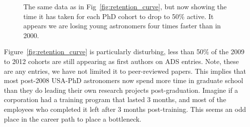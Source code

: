 \documentclass[preprint2]{aastex}
\begin{document}
\begin{figure*}
  \caption{The fraction of Astronomy PhDs still active as first authors on any type of ADS entry (e.g., peer-reviewed journal articles, conference proceedings, grant proposals, arXive papers, etc).  Error bars show ranges computed by comparing the curves to those of authors with unique names and unique names where all records are assumed to be linked.   \label{fig:retention_curve}}
\end{figure*}

\begin{figure}
\caption{The same data as in Fig~\ref{fig:retention_curve}, but now showing the time it has taken for each PhD cohort to drop to 50\% active.  It appears we are losing young astronomers four times faster than in 2000.  \label{fig:retention_50}}
\end{figure}







Figure~\ref{fig:retention_curve} is particularly disturbing, less than 50\% of the 2009 to 2012 cohorts are still appearing as first authors on ADS entries. Note, these are any entries, we have not limited it to peer-reviewed papers.  This implies that most post-2008 USA-PhD astronomers now spend more time in graduate school than they do leading their own research projects post-graduation. Imagine if a corporation had a training program that lasted 3 months, and most of the employees who completed it left after 3 months post-training.  This seems an odd place in the career path to place a bottleneck.
\end{document}
